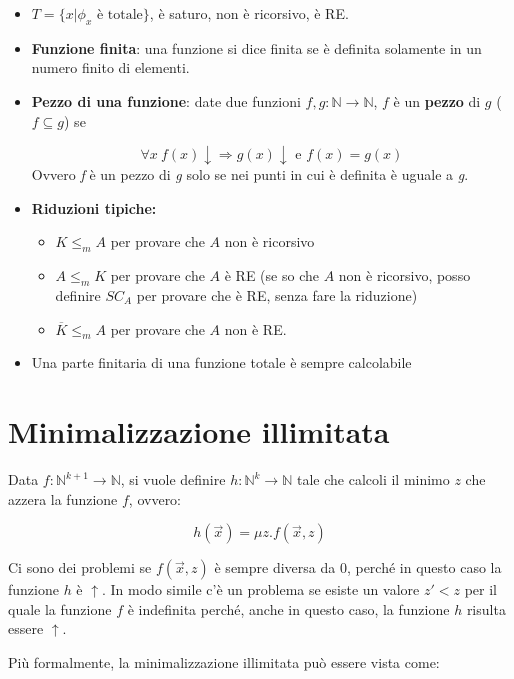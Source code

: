 \begin{itemize}
	\item $T = \{ x | \phi_x \text{ è totale} \}$, è saturo, non è ricorsivo, è RE.
	
	\item \textbf{Funzione finita}: una funzione si dice finita se è definita solamente in un numero finito di elementi.
	
	\item \textbf{Pezzo di una funzione}: date due funzioni $f,g : \mathbb{N} \rightarrow \mathbb{N}$, $f$ è un \textbf{pezzo} di $g$ ($f \subseteq g$) se
	
	$$
	\forall x \: f(x) \downarrow \Rightarrow g(x) \downarrow \text{ e } f(x) = g(x)
	$$
	Ovvero \textit{f} è un pezzo di \textit{g} solo se nei punti in cui è definita è uguale a \textit{g}.
	
	\item \textbf{Riduzioni tipiche:}
	\begin{itemize}
		\item $K \leq_m A$ per provare che $A$ non è ricorsivo
		\item $A \leq_m K$ per provare che $A$ è RE (se so che $A$ non è ricorsivo, posso definire $SC_A$ per provare che è RE, senza fare la riduzione)
		\item $\overline{K} \leq_m A$ per provare che $A$ non è RE.
	\end{itemize}
	
	\item Una parte finitaria di una funzione totale è sempre calcolabile
\end{itemize}

\section{Minimalizzazione illimitata}\label{ex:minima}

Data $f : \mathbb{N}^{k+1} \rightarrow \mathbb{N}$, si vuole definire $h : \mathbb{N}^{k} \rightarrow \mathbb{N}$ tale che calcoli il minimo $z$ che azzera la funzione $f$, ovvero:

$$
h(\vec{x}) = \mu z . f(\vec{x},z)
$$

Ci sono dei problemi se $f(\vec{x},z)$ è sempre diversa da 0, perché in questo caso la funzione $h$ è $\uparrow$. In modo simile c'è un problema se esiste un valore $z' < z$ per il quale la funzione $f$ è indefinita perché, anche in questo caso, la funzione $h$ risulta essere $\uparrow$.

Più formalmente, la minimalizzazione illimitata può essere vista come:

